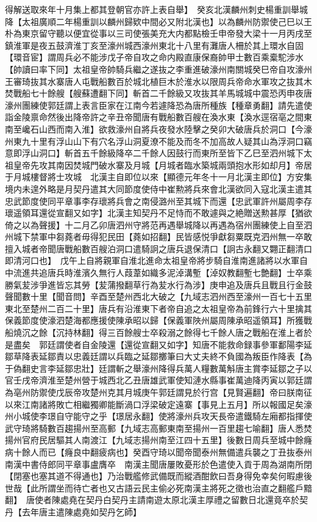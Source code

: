 得解送取來年十月集上都其登朝官亦許上表自舉】　癸亥北漢麟州刺史楊重訓舉城降【太祖廣順二年楊重訓以麟州歸欵中間必又附北漢也】以為麟州防禦使己巳以王朴為東京留守聽以便宜從事以三司使張美充大内都點檢壬申帝發大梁十一月丙戌至鎮淮軍是夜五鼓濟淮丁亥至濠州城西濠州東北十八里有灘唐人柵於其上環水自固【環音宦】謂周兵必不能涉戊子帝自攻之命内殿直康保裔帥甲士數百乘槖駝涉水【帥讀曰率下同】太祖皇帝帥騎兵繼之遂抜之李重進破濠州南關城癸巳帝自攻濠州王審琦抜其水寨唐人屯戰船數百於城北植巨木於淮水以限周兵帝命水軍攻之抜其木焚戰船七十餘艘【艘蘇遭翻下同】斬首二千餘級又攻抜其羊馬城城中震恐丙申夜唐濠州團練使郭廷謂上表言臣家在江南今若遽降恐為唐所種族【種章勇翻】請先遣使詣金陵禀命然後出降帝許之辛丑帝聞唐有戰船數百艘在渙水東【渙水逕宿亳之間東南至巉石山西而南入淮】欲救濠州自將兵夜發水陸擊之癸卯大破唐兵於洞口【今濠州東九十里有浮山山下有穴名浮山洞夏潦不能及而冬不加高故人疑其山為浮洞口竊意即浮山洞口】斬首五千餘級降卒二千餘人因鼓行而東所至皆下乙巳至泗州城下太祖皇帝先攻其南因焚城門破水寨及月城【月城者臨水築城兩頭抱水形如却月】帝居于月城樓督將士攻城　北漢主自即位以來【顯德元年冬十一月北漢主即位】方安集境内未遑外略是月契丹遣其大同節度使侍中崔勲將兵來會北漢欲同入寇北漢主遣其忠武節度使同平章事李存瓌將兵會之南侵潞州至其城下而還【忠武軍許州屬周李存瓌遥領耳還從宣翻又如字】北漢主知契丹不足恃而不敢遽與之絶贈送勲甚厚【猶欲倚之以為聲援】十二月乙卯唐泗州守將范再遇舉城降以再遇為宿州團練使上自至泗州城下禁軍中芻蕘者毋得犯民田【蕘如招翻】民皆感悦爭獻芻粟既克泗州無一卒敢擅入城者帝聞唐戰船數百艘泊洞口遣騎詗之唐兵退保清口【詗古永翻又翾正翻清口即清河口也】　戊午上自將親軍自淮北進命太祖皇帝將步騎自淮南進諸將以水軍自中流進共追唐兵時淮濱久無行人葭葦如織多泥淖溝塹【淖奴教翻塹七艶翻】士卒乘勝氣苃涉爭進皆忘其勞【苃蒲撥翻草行為苃水行為涉】庚申追及唐兵且戰且行金鼓聲聞數十里【聞音問】辛酉至楚州西北大破之【九域志泗州西至濠州一百七十五里東北至楚州二百二十里】唐兵有沿淮東下者帝自追之太祖皇帝為前鋒行六十里擒其保義節度使濠泗楚海都應援使陳承昭以歸【保義軍陜州屬周陳承昭遥領耳】所獲戰船燒沉之餘【沉持林翻】得三百餘艘士卒殺溺之餘得七千餘人唐之戰船在淮上者於是盡矣　郭廷謂使者自金陵還【還從宣翻又如字】知唐不能救命録事參軍鄱陽李延鄒草降表延鄒責以忠義廷謂以兵臨之延鄒擲筆曰大丈夫終不負國為叛臣作降表【為于偽翻史言李延鄒忠壯】廷謂斬之舉濠州降得兵萬人糧數萬斛唐主賞李延鄒之子以官壬戌帝濟淮至楚州營于城西北乙丑唐雄武軍使知漣水縣事崔萬迪降丙寅以郭廷謂為亳州防禦使戊辰帝攻楚州克其月城庚午郭廷謂見於行宫【見賢遍翻】帝曰朕南征以來江南諸將敗亡相繼獨卿能斷渦口浮梁破定遠寨【事見上五月】所以報國足矣濠州小城使李璟自守能守之乎【璟居永翻】使將濠州兵攻天長帝遣鐵騎左廂都指揮使武守琦將騎數百趨揚州至高郵【九域志高郵東南至揚州一百里趨七喻翻】唐人悉焚揚州官府民居驅其人南渡江【九域志揚州南至江四十五里】後數日周兵至城中餘癃病十餘人而已【癃良中翻疲病也】癸酉守琦以聞帝聞泰州無備遣兵襲之丁丑抜泰州　南漢中書侍郎同平章事盧膺卒　南漢主聞唐屢敗憂形於色遣使入貢于周為湖南所閉【閉塞也塞其道不得通也】乃治戰艦修武備既而縱酒酣飲曰吾身得免幸矣何暇慮後世哉【此所謂坐而待亡者也又古語云民主偷必死南漢主將死之徵也治直之翻艦戶黯翻】　唐使者陳處堯在契丹白契丹主請南遊太原北漢主厚禮之留數日北還竟卒於契丹【去年唐主遣陳處堯如契丹乞師】

